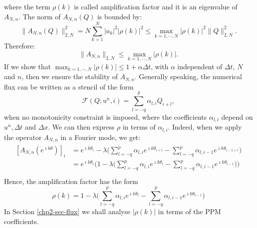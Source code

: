 where the term $\rho(k)$ is called amplification factor and it is an eigenvalue of $A_{N,n}$.
The norm of $A_{N,n}(Q)$ is bounded by:
\begin{equation*}
	\|A_{N,n}(Q)\|_{2,N}^2 = N \sum_{k=1}^{N} |a_k|^2 |\rho(k)|^2 \leq 
	\max_{k=1, \cdots, N}{|\rho(k)|}^2 \|Q\|_{2,N}^2.
\end{equation*}
Therefore:
\begin{equation*}
	\|A_{N,n}\|_{2,N} \leq \max_{k=1, \cdots, N}{|\rho(k)|}.
\end{equation*}
If we show that $\max_{k=1, \cdots, N}{|\rho(k)|} \leq 1 + \alpha \Delta t$, 
with $\alpha$ independent of $\Delta t$, $N$ and $n$, then we ensure the stability of $A_{N,n}$.
Generally speaking, the numerical flux can be written as a stencil of the form
\begin{equation*}
	\mathcal{F}(Q; u^n,i) = \sum_{l=-q}^p \alpha_{l,i} Q_{i+l}, 
\end{equation*}
when no monotonicity constraint is imposed, 
where the coefficients $\alpha_{l,i}$ depend on $u^n, \Delta t$ and $\Delta x$.
We can then express $\rho$ in terms of $\alpha_{l,i}$.
Indeed, when we apply the operator $A_{N,n}$ in a Fourier mode, we get:
\begin{align*}
	\begin{split}
		[A_{N,n}(e^{\imath k\theta})]_i &= e^{\imath k\theta_i} - \lambda 
																\bigg(\sum_{l=-q}^p \alpha_{l,i}   e^{\imath k\theta_{i+l}} - 
																			\sum_{l=-q}^p \alpha_{l,i-1} e^{\imath k\theta_{i-1+l}} \bigg)\\
		&= e^{\imath k \theta_i}\bigg(1 - \lambda 
																			\bigg(\sum_{l=-q}^p \alpha_{l,i}   e^{\imath k\theta_{l}} - 
																			\sum_{l=-q}^p \alpha_{l,i-1} e^{\imath k\theta_{l-1}} \bigg) \bigg)\\
	\end{split}
\end{align*}
Hence, the amplification factor has the form
\begin{equation}
\label{chp2-amplification}
\rho(k) = 1 - \lambda
					\bigg(\sum_{l=-q}^p \alpha_{l,i}   e^{\imath k\theta_{l}} - 
					\sum_{l=-q}^p \alpha_{l,i-1} e^{\imath k\theta_{l-1}} \bigg)
\end{equation}
In Section \ref{chp2-sec-flux} we shall analyse $|\rho(k)|$ in terms of the PPM coefficients.


